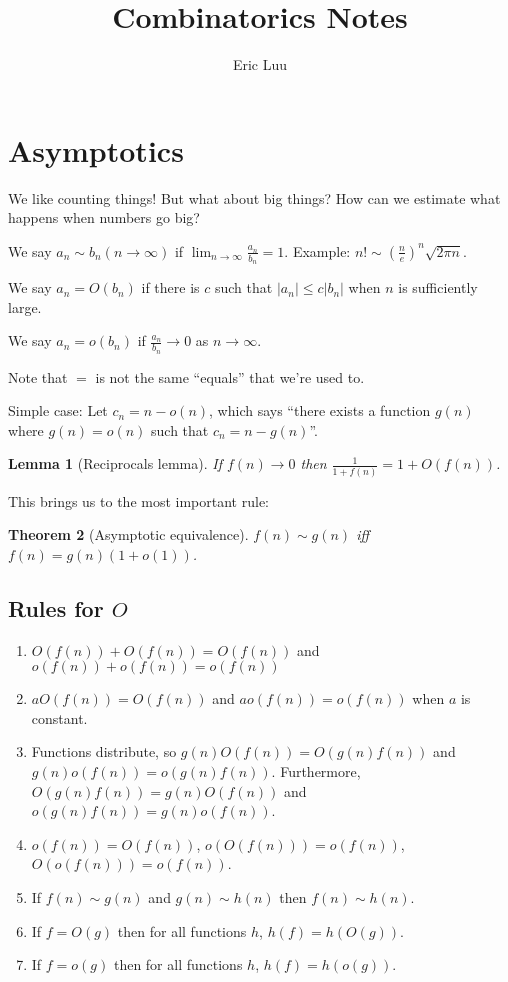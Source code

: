 \documentclass[]{article}
\title{Combinatorics Notes}
\author{Eric Luu}
\newtheorem{theorem}{Theorem}
\newtheorem{lemma}[theorem]{Lemma}
\theoremstyle{definition}
\numberwithin{theorem}{section}
\numberwithin{equation}{section}
\begin{document}
\maketitle
\section{Asymptotics}

We like counting things! But what about big things? How can we estimate what happens when numbers go big?

We say $a_n \sim b_n (n \rightarrow \infty)$ if $\lim_{n \rightarrow \infty} \frac{a_n}{b_n} = 1$. 
Example: $n! \sim \left(\frac{n}{e}\right)^n \sqrt{2 \pi n}$. 

We say $a_n = O(b_n)$ if there is $c$ such that $|a_n| \leq c |b_n|$ when $n$ is sufficiently large. 

We say $a_n = o(b_n)$ if $\frac{a_n}{b_n} \rightarrow 0$ as $n \rightarrow \infty$. 

Note that $=$ is not the same ``equals'' that we're used to.

Simple case:
Let $c_n = n - o(n)$, which says ``there exists a function $g(n)$ where $g(n) = o(n)$ such that $c_n = n - g(n)$''.

\begin{lemma}[Reciprocals lemma]
	If $f(n) \rightarrow 0$ then $\frac{1}{1 + f(n)} = 1 + O(f(n))$. 
\end{lemma}

This brings us to the most important rule:
\begin{theorem}[Asymptotic equivalence]
	$f(n) \sim g(n)$ iff $f(n) = g(n)(1 + o(1))$.
\end{theorem}

\subsection{Rules for $O$}
\begin{enumerate}
	\item $O(f(n)) + O(f(n)) = O(f(n))$ and $o(f(n)) + o(f(n)) = o(f(n))$
	\item $a O(f(n)) = O(f(n))$ and $a o(f(n)) = o(f(n))$ when $a$ is constant. 
	\item Functions distribute, so $g(n) O(f(n)) = O(g(n) f(n))$ and $g(n) o(f(n)) = o(g(n) f(n))$. Furthermore, $O(g(n) f(n)) = g(n) O(f(n))$ and  $o(g(n) f(n)) = g(n) o(f(n))$. 
	\item $o(f(n)) = O(f(n))$, $o(O(f(n))) = o(f(n))$, $O(o(f(n))) = o(f(n))$. 
	\item If $f(n) \sim g(n)$ and $g(n) \sim h(n)$ then $f(n) \sim h(n)$. 
	\item If $f= O(g)$ then for all functions $h$, $h(f) = h(O(g))$. 
	\item If $f= o(g)$ then for all functions $h$, $h(f) = h(o(g))$. 
\end{enumerate}
\end{document}
